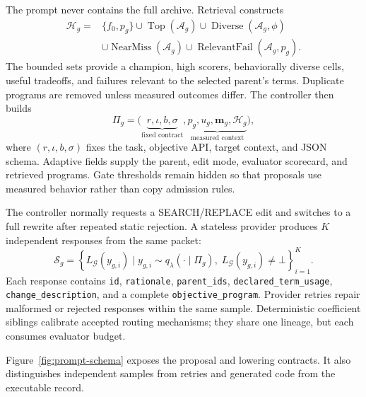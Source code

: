 The prompt never contains the full archive. Retrieval constructs
\begin{equation}
\begin{aligned}
\mathcal{H}_g={}&\{f_0,p_g\}\cup\operatorname{Top}(\mathcal{A}_g)
\cup\operatorname{Diverse}(\mathcal{A}_g,\phi)\\
&\cup\operatorname{NearMiss}(\mathcal{A}_g)
\cup\operatorname{RelevantFail}(\mathcal{A}_g,p_g).
\end{aligned}
\label{eq:retrieval-policy}
\end{equation}
The bounded sets provide a champion, high scorers, behaviorally diverse cells,
useful tradeoffs, and failures relevant to the selected parent's terms.
Duplicate programs are removed unless measured outcomes differ. The controller
then builds
\begin{equation}
\Pi_g=\bigl(\underbrace{r,\iota,b,\sigma}_{\text{fixed contract}},
\underbrace{p_g,u_g,\mathbf{m}_g,\mathcal{H}_g}_{\text{measured context}}\bigr),
\label{eq:prompt-packet}
\end{equation}
where $(r,\iota,b,\sigma)$ fixes the task, objective API, target context, and
JSON schema. Adaptive fields supply the parent, edit mode, evaluator scorecard,
and retrieved programs. Gate thresholds remain hidden so that proposals use
measured behavior rather than copy admission rules.

The controller normally requests a SEARCH/REPLACE edit and switches to a full
rewrite after repeated static rejection. A stateless provider produces $K$
independent responses from the same packet:
\begin{equation}
\mathcal{S}_g=\left\{L_{\mathcal{G}}(y_{g,i})\mid
y_{g,i}\sim q_\lambda(\cdot\mid\Pi_g),\;
L_{\mathcal{G}}(y_{g,i})\neq\bot\right\}_{i=1}^{K}.
\label{eq:candidate-set}
\end{equation}
Each response contains \texttt{id}, \texttt{rationale},
\texttt{parent\_ids},
\texttt{declared\_\allowbreak term\_\allowbreak usage},
\texttt{change\_\allowbreak description}, and a complete
\texttt{objective\_\allowbreak program}. Provider retries repair malformed or rejected
responses within the same sample. Deterministic coefficient siblings calibrate
accepted routing mechanisms; they share one lineage, but each consumes
evaluator budget.

Figure~\ref{fig:prompt-schema} exposes the proposal and lowering contracts.
It also distinguishes independent samples from retries and generated code from
the executable record.

